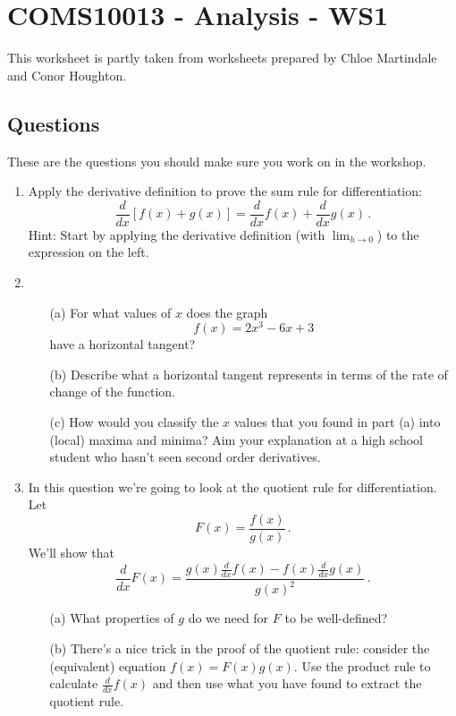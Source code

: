 \documentclass[11pt,a4paper]{scrartcl}
\begin{document}
\section*{COMS10013 - Analysis - WS1}
This worksheet is partly taken from worksheets prepared by Chloe Martindale and Conor Houghton.

\subsection*{Questions}

These are the questions you should make sure you work on in the workshop.

\begin{enumerate}
\item Apply the derivative definition to prove the sum rule for differentiation:
\[
\frac{d}{dx}\left[f(x) + g(x)\right] = \frac{d}{dx}f(x) + \frac{d}{dx}g(x)\,.
\]
Hint: Start by applying the derivative definition (with $\lim_{h\to 0}$) to the expression on the left. 

\item 
\begin{enumerate}
    \item[(a)] For what values of $x$ does the graph
    \[
        f(x) = 2x^3-6x+3
    \]
    have a  horizontal tangent?
    \item[(b)] Describe what a horizontal tangent represents in terms of the rate of change of the function. 
    \item[(c)] How would you classify the $x$ values that you found in part (a) into (local) maxima and minima? Aim your explanation at a high school student who hasn't seen second order derivatives. 
\end{enumerate}

\item In this question we're going to look at the quotient rule for differentiation. Let 
\[
F(x) = \frac{f(x)}{g(x)}\,.
\]
We'll show that 
\[
\frac{d}{dx}F(x) = \frac{g(x)\frac{d}{dx}f(x) - f(x) \frac{d}{dx}g(x)}{g(x)^2}\,.
\]
\begin{enumerate}
    \item[(a)] What properties of $g$ do we need for $F$ to be well-defined?
    \item[(b)] There's a nice trick in the proof of the quotient rule: consider the (equivalent) equation $f(x) = F(x)g(x)$. Use the product rule to calculate $\frac{d}{dx}f(x)$ and then use what you have found to extract the quotient rule. 
\end{enumerate}






\end{enumerate}
\end{document}
